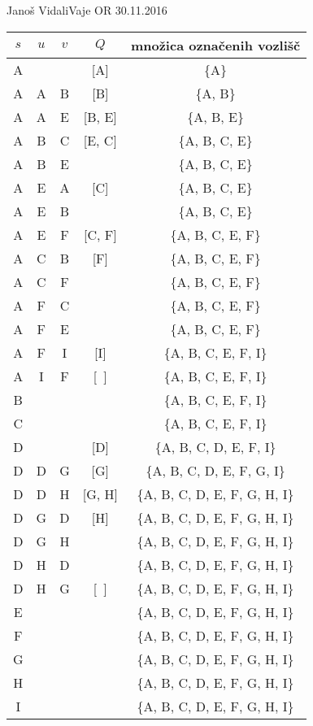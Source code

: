\begin{naloga}{Janoš Vidali}{Vaje OR 30.11.2016}
\begin{odgovor}
\begin{tabela}
\begin{tabular}{c|c|c|c|c}
$s$ & $u$ & $v$ & $Q$ & množica označenih vozlišč \\ \hline
A &   &   & [A]  & \{A\} \\
A & A & B & [B] & \{A, B\} \\
A & A & E & [B, E] & \{A, B, E\} \\
A & B & C & [E, C] & \{A, B, C, E\} \\
A & B  & E &  & \{A, B, C, E\} \\
A & E & A & [C] & \{A, B, C, E\} \\
A & E & B &  & \{A, B, C, E\} \\
A & E & F & [C, F] & \{A, B, C, E, F\} \\
A & C  & B & [F] &  \{A, B, C, E, F\} \\
A & C & F &  &  \{A, B, C, E, F\} \\
A & F & C &  &  \{A, B, C, E, F\} \\
A & F  & E &  &  \{A, B, C, E, F\} \\
A & F & I & [I] &  \{A, B, C, E, F, I\} \\
A & I  & F & [\ ] &  \{A, B, C, E, F, I\} \\
B & & & &  \{A, B, C, E, F, I\} \\
C & & & &  \{A, B, C, E, F, I\} \\
D & & & [D] &  \{A, B, C, D, E, F, I\} \\
D &D &G &[G] &  \{A, B, C, D, E, F, G, I\} \\
D &D &H &[G, H] &  \{A, B, C, D, E, F, G, H, I\} \\
D &G &D &[H] &  \{A, B, C, D, E, F, G, H, I\} \\
D &G &H & &  \{A, B, C, D, E, F, G, H, I\} \\
D &H &D & &  \{A, B, C, D, E, F, G, H, I\} \\
D &H &G &  [\ ]&  \{A, B, C, D, E, F, G, H, I\} \\
E & & & &  \{A, B, C, D, E, F, G, H, I\} \\
F & & & &  \{A, B, C, D, E, F, G, H, I\} \\
G & & & &  \{A, B, C, D, E, F, G, H, I\} \\
H & & & &  \{A, B, C, D, E, F, G, H, I\} \\
I & & & &  \{A, B, C, D, E, F, G, H, I\} \\
\end{tabular}
\end{tabela}

\begin{slika}
\end{slika}

\end{odgovor}
\end{naloga}
